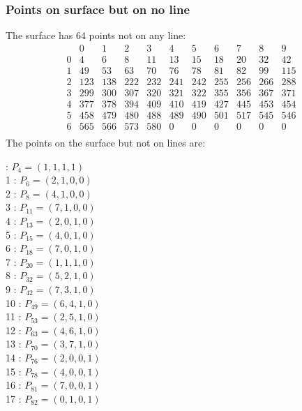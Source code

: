 \documentclass{article}
\begin{document}
{\subsubsection*{Points on surface but on no line}
The surface has 64 points not on any line:\\
$$
\begin{array}{r|*{10}{r}}
 & 0 & 1 & 2 & 3 & 4 & 5 & 6 & 7 & 8 & 9\\
\hline
0 & 4 & 6 & 8 & 11 & 13 & 15 & 18 & 20 & 32 & 42\\
1 & 49 & 53 & 63 & 70 & 76 & 78 & 81 & 82 & 99 & 115\\
2 & 123 & 138 & 222 & 232 & 241 & 242 & 255 & 256 & 266 & 288\\
3 & 299 & 300 & 307 & 320 & 321 & 322 & 355 & 356 & 367 & 371\\
4 & 377 & 378 & 394 & 409 & 410 & 419 & 427 & 445 & 453 & 454\\
5 & 458 & 479 & 480 & 488 & 489 & 490 & 501 & 517 & 545 & 546\\
6 & 565 & 566 & 573 & 580 & 0 & 0 & 0 & 0 & 0 & 0\\
\end{array}
$$
The points on the surface but not on lines are:\\
\begin{multicols}{2}
 : $P_{4}=( 1, 1, 1, 1 )$\\
1 : $P_{6}=( 2, 1, 0, 0 )$\\
2 : $P_{8}=( 4, 1, 0, 0 )$\\
3 : $P_{11}=( 7, 1, 0, 0 )$\\
4 : $P_{13}=( 2, 0, 1, 0 )$\\
5 : $P_{15}=( 4, 0, 1, 0 )$\\
6 : $P_{18}=( 7, 0, 1, 0 )$\\
7 : $P_{20}=( 1, 1, 1, 0 )$\\
8 : $P_{32}=( 5, 2, 1, 0 )$\\
9 : $P_{42}=( 7, 3, 1, 0 )$\\
10 : $P_{49}=( 6, 4, 1, 0 )$\\
11 : $P_{53}=( 2, 5, 1, 0 )$\\
12 : $P_{63}=( 4, 6, 1, 0 )$\\
13 : $P_{70}=( 3, 7, 1, 0 )$\\
14 : $P_{76}=( 2, 0, 0, 1 )$\\
15 : $P_{78}=( 4, 0, 0, 1 )$\\
16 : $P_{81}=( 7, 0, 0, 1 )$\\
17 : $P_{82}=( 0, 1, 0, 1 )$\\

\end{multicols}}
\end{document}
